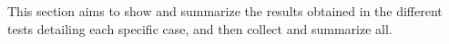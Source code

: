 This section aims to show and summarize the results obtained in the different tests detailing each specific case, and then collect and summarize all.
